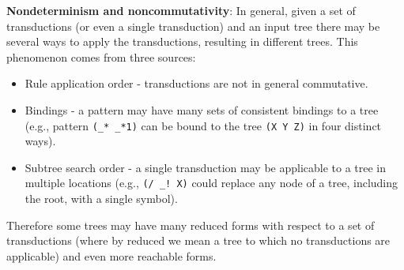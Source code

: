 \documentclass[a4,11pt]{article}
\begin{document}




{\bf Nondeterminism and noncommutativity}:
In general, given a set of transductions (or even a single transduction) and an input tree there may be several ways to apply the transductions, resulting in different trees. This phenomenon comes from three sources:
  \begin{itemize}
  \item Rule application order - transductions are not in general commutative.
  \item Bindings  - a pattern may have many sets of consistent bindings to a tree (e.g., pattern \texttt{(\_* \_*1)} can be bound to the tree \texttt{(X Y Z)} in four distinct ways). 
  \item Subtree search order - a single transduction may be applicable to a tree in multiple locations (e.g., \texttt{(/ \_! X)} could replace any node of a tree, including the root, with a single symbol).
  \end{itemize}
  Therefore some trees may have many reduced forms with respect to a set of transductions (where by reduced we mean a tree to which no transductions are applicable) and even more reachable forms. 
\end{document}
